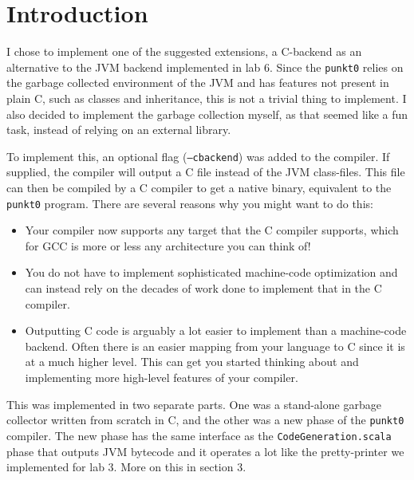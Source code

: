 \section{Introduction}
I chose to implement one of the suggested extensions, a C-backend as an alternative to the JVM backend implemented in lab 6. Since the \texttt{punkt0} relies on the garbage collected environment of the JVM and has features not present in plain C, such as classes and inheritance, this is not a trivial thing to implement. I also decided to implement the garbage collection myself, as that seemed like a fun task, instead of relying on an external library.

To implement this, an optional flag (\texttt{--cbackend}) was added to the compiler. If supplied, the compiler will output a C file instead of the JVM class-files. This file can then be compiled by a C compiler to get a native binary, equivalent to the \texttt{punkt0} program. There are several reasons why you might want to do this:
\begin{itemize}
    \item Your compiler now supports any target that the C compiler supports, which for GCC is more or less any architecture you can think of!
    \item You do not have to implement sophisticated machine-code optimization and can instead rely on the decades of work done to implement that in the C compiler.
    \item Outputting C code is arguably a lot easier to implement than a machine-code backend. Often there is an easier mapping from your language to C since it is at a much higher level. This can get you started thinking about and implementing more high-level features of your compiler.
\end{itemize}
This was implemented in two separate parts. One was a stand-alone garbage collector written from scratch in C, and the other was a new phase of the \texttt{punkt0} compiler. The new phase has the same interface as the \texttt{CodeGeneration.scala} phase that outputs JVM bytecode and it operates a lot like the pretty-printer we implemented for lab 3. More on this in section 3.